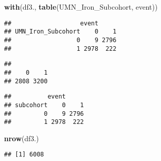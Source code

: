 \documentclass[
]{article}
\newenvironment{Shaded}{\begin{snugshade}}{\end{snugshade}}
\newcommand{\KeywordTok}[1]{\textcolor[rgb]{0.13,0.29,0.53}{\textbf{#1}}}
\newcommand{\NormalTok}[1]{#1}
\newcommand{\OperatorTok}[1]{\textcolor[rgb]{0.81,0.36,0.00}{\textbf{#1}}}
\newcommand{\StringTok}[1]{\textcolor[rgb]{0.31,0.60,0.02}{#1}}
\begin{document}
\begin{Shaded}
\begin{Highlighting}[]
\KeywordTok{with}\NormalTok{(df3., }\KeywordTok{table}\NormalTok{(UMN_Iron_Subcohort, event))}
\end{Highlighting}
\end{Shaded}

\begin{verbatim}
##                   event
## UMN_Iron_Subcohort    0    1
##                  0    9 2796
##                  1 2978  222
\end{verbatim}

\begin{Shaded}
\end{Shaded}

\begin{verbatim}
## 
##    0    1 
## 2808 3200
\end{verbatim}

\begin{Shaded}
\end{Shaded}

\begin{verbatim}
##          event
## subcohort    0    1
##         0    9 2796
##         1 2978  222
\end{verbatim}

\begin{Shaded}
\begin{Highlighting}[]
\KeywordTok{nrow}\NormalTok{(df3.)}
\end{Highlighting}
\end{Shaded}

\begin{verbatim}
## [1] 6008
\end{verbatim}

\begin{Shaded}
\end{Shaded}
\end{document}
